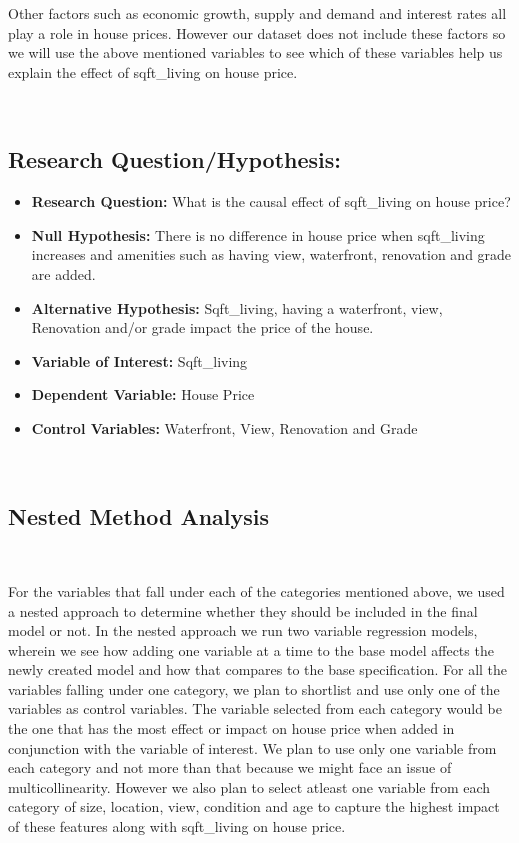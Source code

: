 \documentclass[
]{article}
\begin{document}
Other factors such as economic growth, supply and demand and interest
rates all play a role in house prices. However our dataset does not
include these factors so we will use the above mentioned variables to
see which of these variables help us explain the effect of sqft\_living
on house price.

~

\hypertarget{research-questionhypothesis}{%
\subsection{Research
Question/Hypothesis:}\label{research-questionhypothesis}}

\begin{itemize}
\item
  \textbf{Research Question:} What is the causal effect of sqft\_living
  on house price?
\item
  \textbf{Null Hypothesis:} There is no difference in house price when
  sqft\_living increases and amenities such as having view, waterfront,
  renovation and grade are added.
\item
  \textbf{Alternative Hypothesis:} Sqft\_living, having a waterfront,
  view, Renovation and/or grade impact the price of the house.
\item
  \textbf{Variable of Interest:} Sqft\_living
\item
  \textbf{Dependent Variable:} House Price
\item
  \textbf{Control Variables:} Waterfront, View, Renovation and Grade
\end{itemize}

~

\hypertarget{nested-method-analysis}{%
\subsection{Nested Method Analysis}\label{nested-method-analysis}}

~

For the variables that fall under each of the categories mentioned
above, we used a nested approach to determine whether they should be
included in the final model or not. In the nested approach we run two
variable regression models, wherein we see how adding one variable at a
time to the base model affects the newly created model and how that
compares to the base specification. For all the variables falling under
one category, we plan to shortlist and use only one of the variables as
control variables. The variable selected from each category would be the
one that has the most effect or impact on house price when added in
conjunction with the variable of interest. We plan to use only one
variable from each category and not more than that because we might face
an issue of multicollinearity. However we also plan to select atleast
one variable from each category of size, location, view, condition and
age to capture the highest impact of these features along with
sqft\_living on house price.
\end{document}
